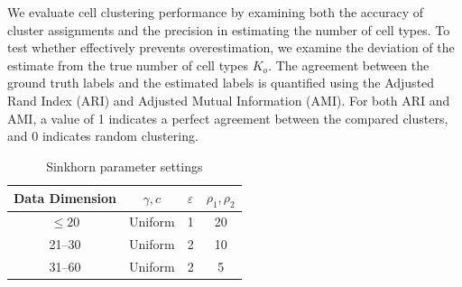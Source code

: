 We evaluate cell clustering performance by examining both the accuracy of cluster assignments and the precision in estimating the number of cell types.
To test whether \methodname effectively prevents overestimation, we examine the deviation of the estimate from the true number of cell types $K_o$. The agreement between the ground truth labels and the estimated labels is quantified using the Adjusted Rand Index (ARI) and Adjusted Mutual Information (AMI).
For both ARI and AMI, a value of 1 indicates a perfect agreement between the compared clusters, and 0 indicates random clustering.
%
\begin{table}[tp]
	\centering
	\caption{Sinkhorn parameter settings}{
		\begin{tabular}{cccc}
			\hline
			\textbf{Data Dimension} & \textbf{$\gamma, c$} & \textbf{$\varepsilon$} & \textbf{$\rho_1, \rho_2$} \\ \hline
			$\leq 20$               & Uniform              & 1                   & 20                        \\
			21--30                  & Uniform              & 2                   & 10                        \\
			31--60                  & Uniform              & 2                   & 5                         \\ \hline
		\end{tabular}}
	\label{tab:parameter-settings}
\end{table}


